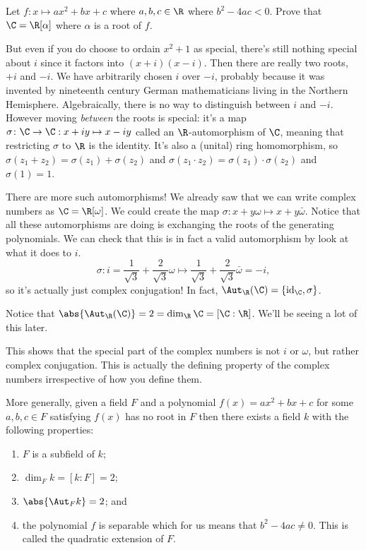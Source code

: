 \begin{exercise}
Let $f\colon x \mapsto ax^2+bx+c$ where $a,b,c \in \R$ where $b^2-4ac < 0$. Prove that $\C = \R[\alpha]$ where $\alpha$ is a root of $f$.
\end{exercise}

But even if you do choose to ordain $x^2+1$ as special, there's still nothing special about $i$ since it factors into $(x+i)(x-i)$. Then there are really two roots, $+i$ and $-i$. We have arbitrarily chosen $i$ over $-i$, probably because it was invented by nineteenth century German mathematicians living in the Northern Hemisphere. Algebraically, there is no way to distinguish between $i$ and $-i$. However moving \emph{between} the roots is special: it's a map $\sigma \colon \C \to \C : x + iy \mapsto x-iy$ called an $\R$-automorphism of $\C$, meaning that restricting $\sigma$ to $\R$ is the identity. It's also a (unital) ring homomorphism, so $\sigma(z_1 + z_2) = \sigma(z_1) + \sigma(z_2)$ and $\sigma(z_1 \cdot z_2) = \sigma(z_1) \cdot \sigma(z_2)$ and $\sigma(1) = 1$.

There are more such automorphisms! We already saw that we can write complex numbers as $\C = \R[\omega]$. We could create the map $\sigma\colon x + y\omega \mapsto x + y\bar{\omega}$. Notice that all these automorphisms are doing is exchanging the roots of the generating polynomials. We can check that this is in fact a valid automorphism by look at what it does to $i$.
\[ \sigma\colon i = \frac{1}{\sqrt{3}} + \frac{2}{\sqrt{3}}\omega \mapsto \frac{1}{\sqrt{3}} + \frac{2}{\sqrt{3}}\bar{\omega} = -i, \]
so it's actually just complex conjugation! In fact, $\Aut_{\R}(\C) = \{\operatorname{id}_{\C}, \sigma\}$. 

\begin{example}
Notice that $\abs{\Aut_{\R}(\C)} = 2 = \dim_{\R}\C = [\C : \R]$. We'll be seeing a lot of this later.
\end{example}

This shows that the special part of the complex numbers is not $i$ or $\omega$, but rather complex conjugation. This is actually the defining property of the complex numbers irrespective of how you define them. 

\begin{proposition}
More generally, given a field $F$ and a polynomial $f(x) = ax^2 + bx + c$ for some $a,b,c \in F$ satisfying $f(x)$ has no root in $F$ then there exists a field $k$ with the following properties:
\begin{enumerate}
\item $F$ is a subfield of $k$;
\item $\dim_Fk = [k : F] = 2$; 
\item $\abs{\Aut_Fk} = 2$; and 
\item the polynomial $f$ is separable which for us means that $b^2-4ac \not=0$.
This is called the quadratic extension of $F$.
\end{enumerate}
\end{proposition}

